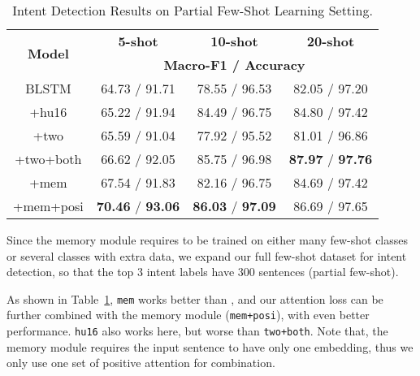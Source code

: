 \begin{table}
\setlength{\tabcolsep}{0.23em}
\centering
\small{
\begin{tabular}{|c|c|c|c|}

\hline
\multirow{2}{*}{\textbf{Model}}  & \multicolumn{1}{|c|}{\textbf{5-shot}} & \multicolumn{1}{|c|}{\textbf{10-shot}} & \multicolumn{1}{|c|}{\textbf{20-shot}}  \\
\cline{2-4}
 & \multicolumn{3}{|c|}{\textbf{Macro-F1 / Accuracy}}   \\
\hline
\rowcolor{Gray} BLSTM & 64.73 / 91.71 & 78.55 / 96.53 & 82.05 / 97.20 \\
\hline
+hu16 & 65.22 / 91.94 & 84.49 / 96.75 & 84.80 / 97.42 \\
\hline
\rowcolor{Gray} +two & 65.59 / 91.04 & 77.92 / 95.52 & 81.01 / 96.86 \\
\hline
+two+both & 66.62 / 92.05 & 85.75 / 96.98 & \textbf{87.97} / \textbf{97.76} \\
\hline
\rowcolor{Gray} +mem & 67.54 / 91.83 & 82.16 / 96.75 & 84.69 / 97.42 \\
\hline
+mem+posi & \textbf{70.46} / \textbf{93.06} & \textbf{86.03} / \textbf{97.09} & 86.69 / 97.65 \\
\hline

\end{tabular}
}
\caption{Intent Detection Results on Partial Few-Shot Learning Setting.}
\label{tab_intent_few_fill}
\vspace{-1em}
\end{table}

Since the memory module requires to be trained on either many few-shot classes or several classes with extra data,
we expand our full few-shot dataset for intent detection, so that the top 3 intent labels have 300 sentences (partial few-shot).

As shown in Table~\ref{tab_intent_few_fill}, \texttt{mem} works better than \BLSTM, and our attention loss can be further combined with the memory module (\texttt{mem+posi}), with even better performance. %
\texttt{hu16} also works here, but  worse than \texttt{two+both}.
Note that, the memory module requires the input sentence to have only one embedding, thus we only use one set of positive attention for combination.

